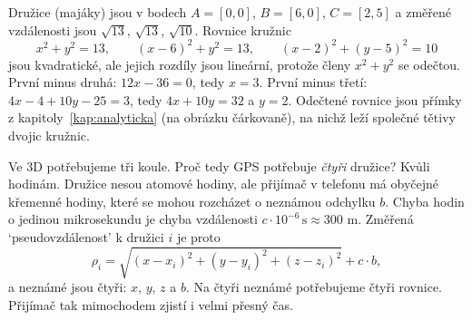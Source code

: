 \begin{center}
\end{center}

\begin{example}
  Družice (majáky) jsou v bodech $A = [0, 0]$, $B = [6, 0]$, $C = [2, 5]$ a změřené vzdálenosti jsou $\sqrt{13}$, $\sqrt{13}$, $\sqrt{10}$. Rovnice kružnic
  \begin{equation*}
    x^2 + y^2 = 13,\qquad (x - 6)^2 + y^2 = 13,\qquad (x - 2)^2 + (y - 5)^2 = 10
  \end{equation*}
  jsou kvadratické, ale jejich rozdíly jsou lineární, protože členy $x^2 + y^2$ se odečtou. První minus druhá: $12x - 36 = 0$, tedy $x = 3$. První minus třetí: $4x - 4 + 10y - 25 = 3$, tedy $4x + 10y = 32$ a $y = 2$. Odečtené rovnice jsou přímky z kapitoly~\ref{kap:analyticka} (na obrázku čárkovaně), na nichž leží společné tětivy dvojic kružnic.
\end{example}

Ve 3D potřebujeme tři koule. Proč tedy GPS potřebuje \textit{čtyři} družice? Kvůli hodinám. Družice nesou atomové hodiny, ale přijímač v telefonu má obyčejné křemenné hodiny, které se mohou rozcházet o neznámou odchylku $b$. Chyba hodin o jedinou mikrosekundu je chyba vzdálenosti $c\cdot 10^{-6}\,\mathrm{s}\approx 300$ m. Změřená `pseudovzdálenost' k družici $i$ je proto
\begin{equation*}
  \rho_i = \sqrt{(x - x_i)^2 + (y - y_i)^2 + (z - z_i)^2} + c\cdot b,
\end{equation*}
a neznámé jsou čtyři: $x$, $y$, $z$ a $b$. Na čtyři neznámé potřebujeme čtyři rovnice. Přijímač tak mimochodem zjistí i velmi přesný čas.

